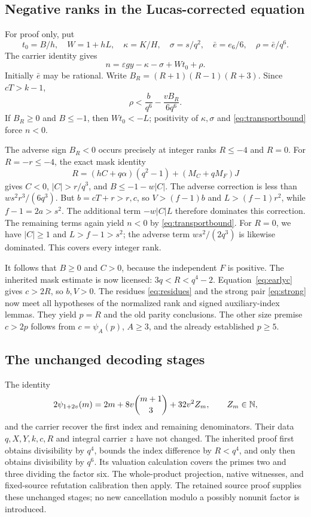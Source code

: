 \documentclass[11pt]{article}
\theoremstyle{definition}
\begin{document}
\subsection{Negative ranks in the Lucas-corrected equation}

For proof only, put
\[
 t_0=B/h,\quad W=1+hL,\quad\kappa=K/H,\quad
 \sigma=s/q^2,\quad\bar e=e_6/6,\quad\rho=\bar e/q^6.
\]
The carrier identity gives
\begin{equation}\label{eq:transport}
 n=\varepsilon gy-\kappa-\sigma+Wt_0+\rho.
\end{equation}
Initially $\bar e$ may be rational. Write $B_R=(R+1)(R-1)(R+3)$.
Since $cT>k-1$,
\[
 \rho<\frac b{q^6}-\frac{vB_R}{6q^6}.
\]
If $B_R\ge0$ and $B\le-1$, then $Wt_0<-L$; positivity of
$\kappa,\sigma$ and \eqref{eq:transportbound} force $n<0$.

The adverse sign $B_R<0$ occurs precisely at integer ranks $R\le-4$
and $R=0$. For $R=-r\le-4$, the exact mask identity
\[
 R=(hC+q\alpha)(q^2-1)+(M_C+qM_F)J
\]
gives $C<0$, $|C|>r/q^3$, and $B\le-1-w|C|$.
The adverse correction is less than $ws^2r^3/(6q^3)$.
But $b=cT+r>r,c$, so $V>(f-1)b$ and
$L>(f-1)r^2$, while $f-1=2a>s^2$.
The additional term $-w|C|L$ therefore dominates this correction.
The remaining terms again yield $n<0$ by \eqref{eq:transportbound}.
For $R=0$, we have $|C|\ge1$ and $L>f-1>s^2$; the adverse
term $ws^2/(2q^3)$ is likewise dominated. This covers every integer rank.

It follows that $B\ge0$ and $C>0$, because the independent $F$ is
positive. The inherited mask estimate is now licensed:
$3q<R<q^4-2$. Equation~\eqref{eq:earlyc} gives $c>2R$, so
$b,V>0$. The residues \eqref{eq:residues} and the strong pair
\eqref{eq:strong} now meet all hypotheses of the normalized rank and
signed auxiliary-index lemmas. They yield $p=R$ and the old parity
conclusions.
The other size premise $c>2p$ follows from $c=\psi_A(p)$,
$A\ge3$, and the already established $p\ge5$.

\subsection{The unchanged decoding stages}

The identity
\[
 2\psi_{1+2v}(m)=2m+8v\binom{m+1}{3}+32v^2Z_m,\qquad Z_m\in\mathbb N,
\]
and the carrier recover the first index and remaining denominators.
Their data $q,X,Y,k,c,R$ and integral carrier $z$ have not changed.
The inherited proof first obtains divisibility by $q^4$, bounds the
index difference by $R<q^4$, and only then obtains divisibility by
$q^6$. Its valuation calculation covers the primes two and three
dividing the factor six. The whole-product projection, native witnesses,
and fixed-source refutation calibration then apply. The retained source
proof supplies these unchanged stages; no new cancellation modulo a
possibly nonunit factor is introduced.
\end{document}
